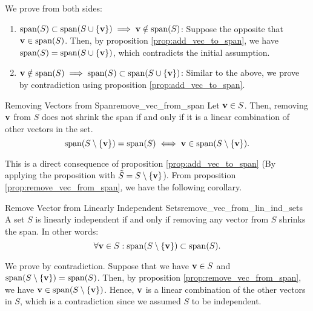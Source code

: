 \begin{proof*}
	We prove from both sides:
	\begin{enumerate}
		\item $\mathrm{span}(S) \subset \mathrm{span}(S\cup\{{\bf v}\}) \implies {\bf v}\notin \mathrm{span}(S)$: Suppose the opposite that ${\bf v} \in \mathrm{span}(S)$. Then, by proposition \ref{prop:add_vec_to_span}, we have $\mathrm{span}(S) = \mathrm{span}(S\cup\{{\bf v}\})$, which contradicts the initial assumption.

		\item ${\bf v}\notin \mathrm{span}(S) \implies \mathrm{span}(S) \subset \mathrm{span}(S\cup\{{\bf v}\})$: Similar to the above, we prove by contradiction using proposition \ref{prop:add_vec_to_span}.
	\end{enumerate} 
\end{proof*} 


\begin{proposition}{Removing Vectors from Span}{remove_vec_from_span}
	Let ${\bf v}\in S$. Then, removing ${\bf v}$ from $S$ does not shrink the span if and only if it is a linear combination of other vectors in the set.
	\begin{equation}
		\mathrm{span}(S\setminus\{{\bf v}\}) = \mathrm{span}(S) \iff {\bf v} \in \mathrm{span}(S\setminus\{{\bf v}\}).	
	\end{equation} 
\end{proposition} 

\begin{proof*}
	This is a direct consequence of proposition \ref{prop:add_vec_to_span} (By applying the proposition with $\tilde S = S\setminus\{{\bf v}\}$). From proposition \ref{prop:remove_vec_from_span}, we have the following corollary.
\end{proof*} 

\begin{corollary}{Remove Vector from Linearly Independent Sets}{remove_vec_from_lin_ind_sets}
	A set $S$ is linearly independent if and only if removing any vector from $S$ shrinks the span. In other words:
	\begin{equation}
		\forall{\bf v}\in S: \mathrm{span}(S\setminus\{{\bf v}\}) \subset \mathrm{span}(S).		
	\end{equation} 	
\end{corollary} 

\begin{proof*}
	We prove by contradiction. Suppose that we have ${\bf v}\in S$ and $\mathrm{span}(S\setminus\{{\bf v}\}) = \mathrm{span}(S)$. Then, by proposition \ref{prop:remove_vec_from_span}, we have ${\bf v}\in\mathrm{span}(S\setminus\{{\bf v}\})$. Hence, ${\bf v}$ is a linear combination of the other vectors in $S$, which is a contradiction since we assumed $S$ to be independent.
\end{proof*} 
